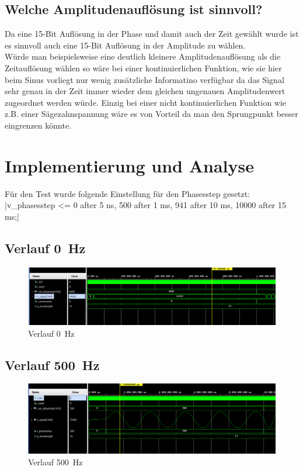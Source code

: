 \documentclass[a4paper,11pt,DIV=11,parskip=half]{scrartcl}
\begin{document}
\subsection{Welche Amplitudenauflösung ist sinnvoll?}
Da eine 15-Bit Auflösung in der Phase und damit auch der Zeit gewählt wurde ist es sinnvoll auch eine 15-Bit Auflösung in der Amplitude zu wählen. \\
Würde man beispielsweise eine deutlich kleinere Amplitudenauflösung als die Zeitauflösung wählen so wäre bei einer kontinuierlichen Funktion, wie sie hier beim Sinus vorliegt nur wenig zusätzliche Informatino verfügbar da das Signal sehr genau in der Zeit immer wieder dem gleichen ungenauen Amplitudenwert zugeordnet werden würde.
Einzig bei einer nicht kontinuierlichen Funktion wie z.B. einer Sägezahnspannung wäre es von Vorteil da man den Sprungpunkt besser eingrenzen könnte. 

\section{Implementierung und Analyse}
Für den Test wurde folgende Einstellung für den Phasesstep gesetzt: \\
|v_phasesstep <= 0 after 5 ns, 500 after 1 ms, 941 after 10 ms, 10000 after 15 ms;|
\subsection{Verlauf \SI{0}{Hz}}
\begin{figure}[H]
	\centering
	\includegraphics[width=\textwidth]{Bilder/DDS_0Hz.png}
	\caption{Verlauf \SI{0}{Hz}}
	\label{fig:tb_0Hz}
\end{figure}
\subsection{Verlauf \SI{500}{Hz}}
\begin{figure}[H]
	\centering
	\includegraphics[width=\textwidth]{Bilder/DDS_500Hz.png}
	\caption{Verlauf \SI{500}{Hz}}
	\label{fig:tb_500Hz}
\end{figure}
\end{document}
